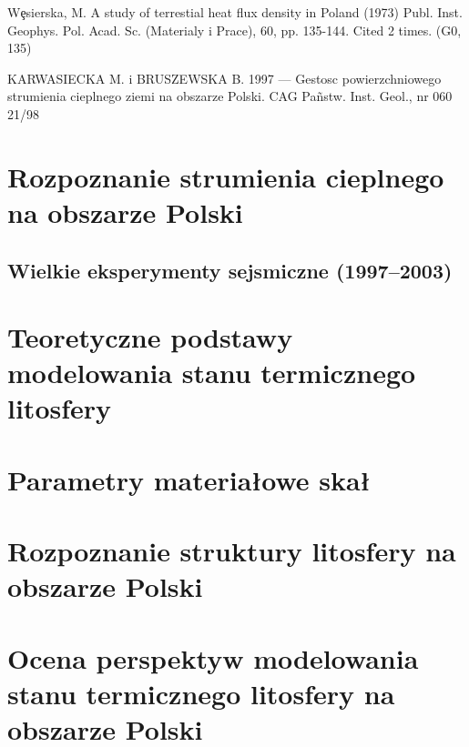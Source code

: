 \documentclass[11.5pt,twoside]{report}
\renewcommand{\headrulewidth}{0pt}}
\begin{document}
Wȩsierska, M.
A study of terrestial heat flux density in Poland
(1973) Publ. Inst. Geophys. Pol. Acad. Sc. (Materialy i Prace), 60, pp. 135-144. Cited 2 times. (G0, 135)

KARWASIECKA M. i BRUSZEWSKA B. 1997 — Gestosc
powierzchniowego strumienia cieplnego ziemi na obszarze Polski.
CAG Pañstw. Inst. Geol., nr 060 21/98
\fi

\chapter{Rozpoznanie strumienia cieplnego na obszarze Polski}

\section{Wielkie eksperymenty sejsmiczne (1997--2003)}

\chapter{Teoretyczne podstawy modelowania stanu termicznego litosfery}


\chapter{Parametry materiałowe skał}


\chapter{Rozpoznanie struktury litosfery na obszarze Polski}

\chapter{Ocena perspektyw modelowania stanu termicznego litosfery na obszarze Polski}

\renewcommand\headrulewidth{0pt} %
{\renewcommand{\markboth}[2]{} %
	\printbibliography[heading=bibintoc,title=Bibliografia]} %
\end{document}
